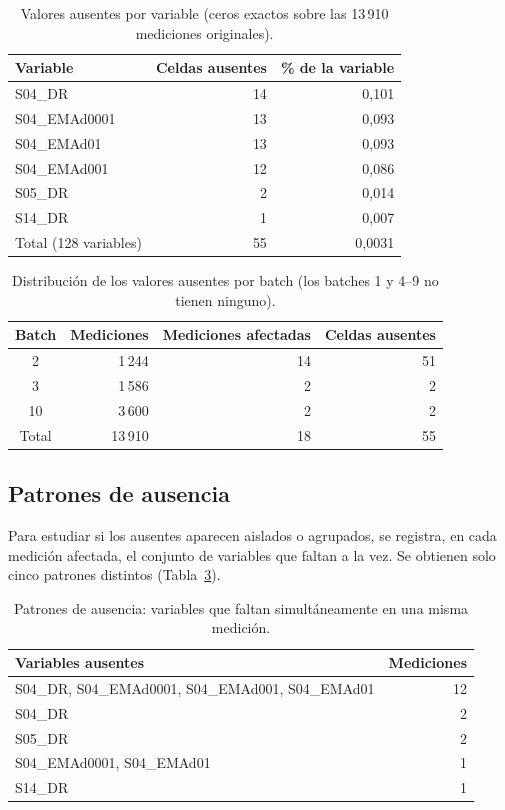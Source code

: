 \begin{table}[h]
\centering
\caption{Valores ausentes por variable (ceros exactos sobre las 13\,910 mediciones originales).}
\label{tab:ausentesVariable}
\begin{tabular}{lrr}
\hline
Variable & Celdas ausentes & \% de la variable \\
\hline
S04\_DR       & 14 & 0,101 \\
S04\_EMAd0001 & 13 & 0,093 \\
S04\_EMAd01   & 13 & 0,093 \\
S04\_EMAd001  & 12 & 0,086 \\
S05\_DR       &  2 & 0,014 \\
S14\_DR       &  1 & 0,007 \\
\hline
Total (128 variables) & 55 & 0,0031 \\
\hline
\end{tabular}
\end{table}

\begin{table}[h]
\centering
\caption{Distribución de los valores ausentes por batch (los batches 1 y 4--9 no tienen ninguno).}
\label{tab:ausentesBatch}
\begin{tabular}{crrr}
\hline
Batch & Mediciones & Mediciones afectadas & Celdas ausentes \\
\hline
2  & 1\,244 & 14 & 51 \\
3  & 1\,586 &  2 &  2 \\
10 & 3\,600 &  2 &  2 \\
\hline
Total & 13\,910 & 18 & 55 \\
\hline
\end{tabular}
\end{table}

\subsection{Patrones de ausencia}

Para estudiar si los ausentes aparecen aislados o agrupados, se registra, en cada medición
afectada, el conjunto de variables que faltan a la vez. Se obtienen solo cinco patrones
distintos (Tabla~\ref{tab:patronesAusentes}).

\begin{table}[h]
\centering
\caption{Patrones de ausencia: variables que faltan simultáneamente en una misma medición.}
\label{tab:patronesAusentes}
\begin{tabular}{lr}
\hline
Variables ausentes & Mediciones \\
\hline
S04\_DR, S04\_EMAd0001, S04\_EMAd001, S04\_EMAd01 & 12 \\
S04\_DR                                          &  2 \\
S05\_DR                                          &  2 \\
S04\_EMAd0001, S04\_EMAd01                       &  1 \\
S14\_DR                                          &  1 \\
\hline
\end{tabular}
\end{table}

